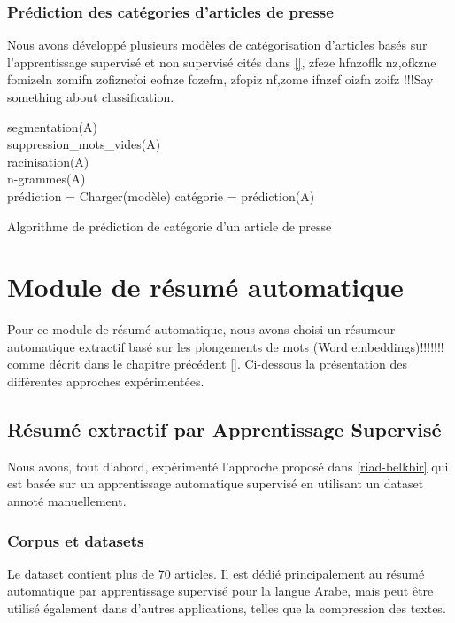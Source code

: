         \subsubsection{Prédiction des catégories d'articles de presse}
            Nous avons développé plusieurs modèles de catégorisation d'articles basés sur l'apprentissage supervisé et non supervisé cités dans \autoref{},  zfeze hfnzoflk nz,ofkzne fomizeln zomifn zofiznefoi eofnze fozefm, zfopiz nf,zome ifnzef oizfn zoifz !!!Say something about classification.
            
            \begin{algorithm2e}[H]
            \SetAlgoLined
            segmentation(A)\\
            suppression\_mots\_vides(A)\\
            racinisation(A)\\
            n-grammes(A)\\
            prédiction = Charger(modèle)
            catégorie = prédiction(A)
            \caption{Algorithme de prédiction de catégorie d'un article de presse}
            \end{algorithm2e}



\section{Module de résumé automatique}
Pour ce module de résumé automatique, nous avons choisi un résumeur automatique extractif \cite{notreresume} basé sur les plongements de mots (Word embeddings)!!!!!!! comme décrit dans le chapitre précédent \autoref{}.
Ci-dessous la présentation des différentes approches expérimentées.
    \subsection{Résumé extractif par Apprentissage Supervisé}
    Nous avons, tout d'abord, expérimenté l'approche proposé dans \ref{riad-belkbir} qui est basée sur un apprentissage automatique supervisé en utilisant un dataset annoté manuellement. 
        \subsubsection{Corpus et datasets}
        Le dataset contient plus de 70 articles. Il est dédié principalement au résumé automatique par apprentissage supervisé pour la langue Arabe, mais peut être utilisé également dans d'autres applications, telles que la compression des textes.

